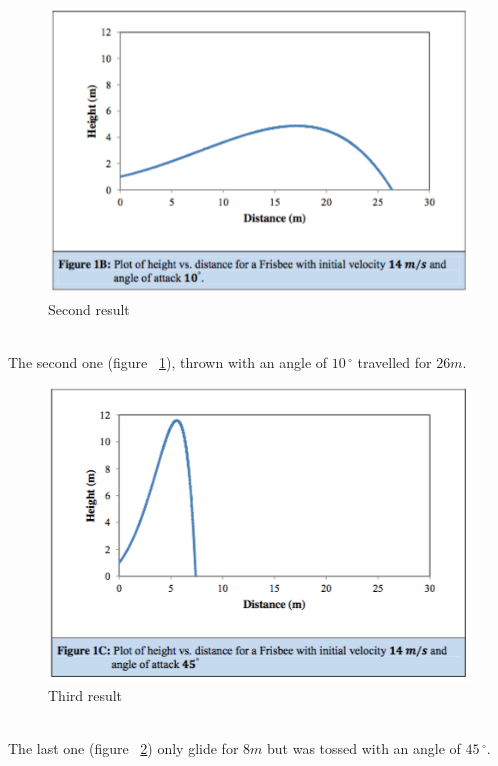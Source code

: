 \documentclass[10pt,a4paper]{report}
\begin{document}
\begin{figure}[!h]
\centering
\includegraphics[scale=0.6]{graph2.jpg}
\caption{Second result}
\label{Second result}
\end{figure}
\\The second one (figure ~\ref{Second result}), thrown with an angle of $10\,^{\circ}$ travelled for $26m$.
\begin{figure}[!h]
\centering
\includegraphics[scale=0.6]{graph3.jpg}
\caption{Third result}
\label{Third result}
\end{figure}
\\The last one (figure ~\ref{Third result}) only glide for $8m$ but was tossed with an angle of $45\,^{\circ} $.
\end{document}
